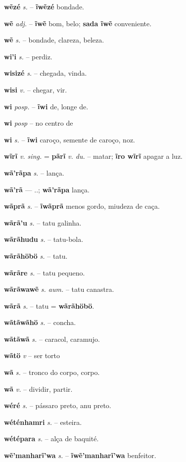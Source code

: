 \textbf{wẽzé} \textit{s.} -- \textbf{ĩwẽzé} bondade.

\textbf{wẽ} \textit{adj.} -- \textbf{ĩwẽ} bom, belo; \textbf{sada ĩwẽ} conveniente.

\textbf{wẽ} \textit{s.} -- bondade, clareza, beleza.

\textbf{wi'i} \textit{s.} -- perdiz.

\textbf{wisizé} \textit{s.} -- chegada, vinda.

\textbf{wisi} \textit{v.} -- chegar, vir.

\textbf{wi} \textit{posp.} -- \textbf{ĩwi} de, longe de.

\textbf{wi} \textit{posp} -- {no centro de}

\textbf{wi} \textit{s.} -- \textbf{ĩwi} caroço, semente de caroço, noz.

\textbf{wĩrĩ} \textit{v. sing.} = \textbf{pãrĩ} \textit{v. du.} -- matar; \textbf{ĩro wĩrĩ} apagar a luz.

\textbf{wã'rãpa} \textit{s.} -- lança.

\textbf{wã'rã} \textit{} --- ..; \textbf{wã'rãpa} lança.

\textbf{wãprã} \textit{s.} -- \textbf{ĩwãprã} menos gordo, miudeza de caça.

\textbf{wãrã'u} \textit{s.} -- tatu galinha.

\textbf{wãrãhudu} \textit{s.} -- tatu-bola.

\textbf{wãrãhöbö} \textit{s.} -- tatu.

\textbf{wãrãre} \textit{s.} -- tatu pequeno.

\textbf{wãrãwawẽ} \textit{s. aum.} -- tatu canastra.

\textbf{wãrã} \textit{s.} -- tatu = \textbf{wãrãhöbö}.

\textbf{wãtãwãhö} \textit{s.} -- concha.

\textbf{wãtãwã} \textit{s.} -- caracol, caramujo.

\textbf{wãtö} \textit{v} -- {ser torto}

\textbf{wã} \textit{s.} -- tronco do corpo, corpo.

\textbf{wã} \textit{v.} -- dividir, partir.

\textbf{wéré} \textit{s.} -- pássaro preto, anu preto.

\textbf{wéténhamri} \textit{s.} -- esteira.

\textbf{wétépara} \textit{s.} -- alça de baquité.

\textbf{wẽ'manharĩ'wa} \textit{s.} -- \textbf{ĩwẽ'manharĩ'wa} benfeitor.

